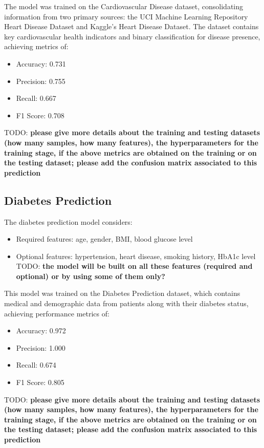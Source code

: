 \documentclass[runningheads,a4paper,11pt]{report}
\newcommand{\todoL}[1]{{\color{green} TODO: \color{green} \textbf{#1}}}
\begin{document}
The model was trained on the Cardiovascular Disease dataset\cite{cardio_dataset}, consolidating information from two primary sources: the UCI Machine Learning Repository Heart Disease Dataset and Kaggle's Heart Disease Dataset. The dataset contains key cardiovascular health indicators and binary classification for disease presence, achieving metrics of:
\begin{itemize}
    \item Accuracy: 0.731
    \item Precision: 0.755
    \item Recall: 0.667
    \item F1 Score: 0.708
\end{itemize}
\todoL{please give more details about the training and testing datasets (how many samples, how many features), the hyperparameters for the training stage, if the above metrics are obtained on the training or on the testing dataset; please add the confusion matrix associated to this prediction}

\subsection{Diabetes Prediction}
The diabetes prediction model considers:
\begin{itemize}
    \item Required features: age, gender, BMI, blood glucose level
    \item Optional features: hypertension, heart disease, smoking history, HbA1c level
     \todoL{the model will be built on all these features (required and optional) or by using some of them only?}
\end{itemize}

This model was trained on the Diabetes Prediction dataset\cite{diabetes_dataset}, which contains medical and demographic data from patients along with their diabetes status, achieving performance metrics of:
\begin{itemize}
    \item Accuracy: 0.972
    \item Precision: 1.000
    \item Recall: 0.674
    \item F1 Score: 0.805
\end{itemize}
\todoL{please give more details about the training and testing datasets (how many samples, how many features), the hyperparameters for the training stage, if the above metrics are obtained on the training or on the testing dataset; please add the confusion matrix associated to this prediction}
\end{document}
